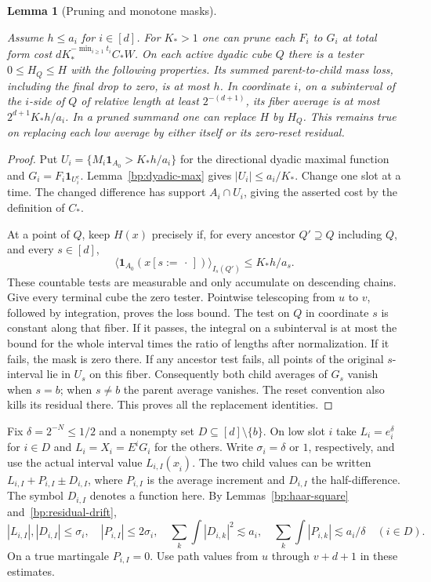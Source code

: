 \documentclass[11pt,letterpaper]{article}
\newtheorem{lemma}[theorem]{Lemma}
\theoremstyle{definition}
\newcommand{\ind}{\mathbf1}
\newcommand{\avg}[2]{\langle #1\rangle_{#2}}
\providecommand{\lean}[1]{}
\providecommand{\uses}[1]{}
\begin{document}
\begin{lemma}[Pruning and monotone masks]\label{bp:prune}
\lean{TwistedParaproduct.prune}
Assume \(h\le a_i\) for \(i\in[d]\). For \(K_*>1\) one can prune
each \(F_i\) to \(G_i\) at total form cost
\(dK_*^{-\min_{i\ge1}t_i}C_*W\). On each active dyadic cube \(Q\)
there is a tester \(0\le H_Q\le H\) with the following properties.
Its summed parent-to-child mass loss, including the final drop to
zero, is at most \(h\). In coordinate \(i\), on a subinterval of the
\(i\)-side of \(Q\) of relative length at least \(2^{-(d+1)}\),
its fiber average is at most \(2^{d+1}K_*h/a_i\). In a pruned summand
one can replace \(H\) by \(H_Q\). This remains true on replacing each
low average by either itself or its zero-reset residual.
\end{lemma}
\begin{proof}
\uses{bp:dyadic-max,bp:stopped-var,bp:haar-square}
Put \(U_i=\{M_i\ind_{A_0}>K_*h/a_i\}\) for the directional dyadic
maximal function and \(G_i=F_i\ind_{U_i^c}\).
Lemma~\ref{bp:dyadic-max} gives \(|U_i|\le a_i/K_*\).
Change one slot at a time. The changed difference has support
\(A_i\cap U_i\), giving the asserted cost by the definition of \(C_*\).

At a point of \(Q\), keep \(H(x)\) precisely if, for every ancestor
\(Q'\supseteq Q\) including \(Q\), and every \(s\in[d]\),
\[
       \avg{\ind_{A_0}(x[s:=\,\cdot\,])}{I_s(Q')}\le K_*h/a_s .
\]
These countable tests are measurable and only accumulate on descending
chains. Give every terminal cube the zero tester. Pointwise telescoping
from \(u\) to \(v\), followed by integration, proves the loss bound.
The test on \(Q\) in coordinate \(s\) is constant along that fiber.
If it passes, the integral on a subinterval is at most the bound for
the whole interval times the ratio of lengths after normalization.
If it fails, the mask is zero there. If any ancestor test fails, all
points of the original \(s\)-interval lie in \(U_s\) on this fiber.
Consequently both child averages of \(G_s\) vanish when \(s=b\);
when \(s\ne b\) the parent average vanishes. The reset convention
also kills its residual there. This proves all the replacement
identities.
\end{proof}

Fix \(\delta=2^{-N}\le1/2\) and a nonempty set
\(D\subseteq[d]\setminus\{b\}\). On low slot \(i\) take
\(L_i=e_i^\delta\) for \(i\in D\) and \(L_i=X_i=E^iG_i\) for the
others. Write \(\sigma_i=\delta\) or \(1\), respectively, and use
the actual interval value \(L_{i,I}(x_{\hat i})\).
The two child values can be written \(L_{i,I}+P_{i,I}\pm D_{i,I}\),
where \(P_{i,I}\) is the average increment and \(D_{i,I}\) the
half-difference. The symbol \(D_{i,I}\) denotes a function here.
By Lemmas~\ref{bp:haar-square} and~\ref{bp:residual-drift},
\[
 |L_{i,I}|,|D_{i,I}|\le\sigma_i,\quad |P_{i,I}|\le2\sigma_i,\quad
 \sum_k\int |D_{i,k}|^2\lesssim a_i,\quad
 \sum_k\int |P_{i,k}|\lesssim a_i/\delta\quad(i\in D).
\]
On a true martingale \(P_{i,I}=0\). Use path values from \(u\) through
\(v+d+1\) in these estimates.
\end{document}
